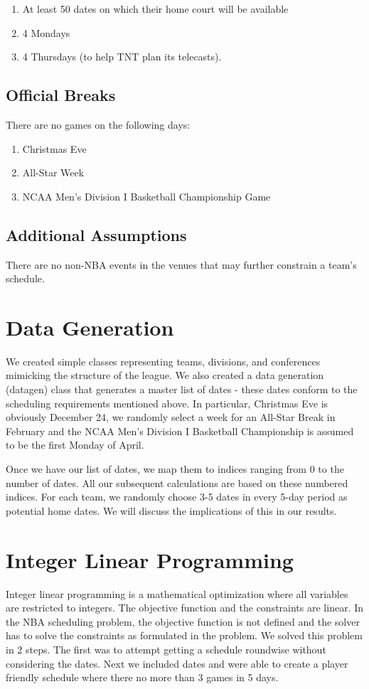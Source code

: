 \documentclass{article}
\begin{document}
	\begin{enumerate}
		\item At least 50 dates on which their home court will be available
		\item 4 Mondays
		\item 4 Thursdays (to help TNT plan its telecasts).
	\end{enumerate}

	\subsection{Official Breaks}

	There are no games on the following days:

	\begin{enumerate}
		\item Christmas Eve
		\item All-Star Week
		\item NCAA Men's Division I Basketball Championship Game
	\end{enumerate}

    \subsection{Additional Assumptions}

    There are no non-NBA events in the venues that may further constrain a team's schedule.

	\section{Data Generation}

	We created simple classes representing teams, divisions, and conferences mimicking the structure of the league. We also created a data generation (datagen) class that generates a master list of dates - these dates conform to the scheduling requirements mentioned above. In particular, Christmas Eve is obviously December 24, we randomly select a week for an All-Star Break in February and the NCAA Men's Division I Basketball Championship is assumed to be the first Monday of April.

	Once we have our list of dates, we map them to indices ranging from 0 to the number of dates. All our subsequent calculations are based on these numbered indices. For each team, we randomly choose 3-5 dates in every 5-day period as potential home dates. We will discuss the implications of this in our results.

	\section{Integer Linear Programming}
	Integer linear programming is a mathematical optimization where all variables are restricted to integers. The objective function and the constraints are linear. In the NBA scheduling problem, the objective function is not defined and the solver has to solve the constraints as formulated in the problem. We solved this problem in 2 steps. The first was to attempt getting a schedule roundwise without considering the dates. Next we included dates and were able to create a player friendly schedule where there no more than 3 games in 5 days.
\end{document}
